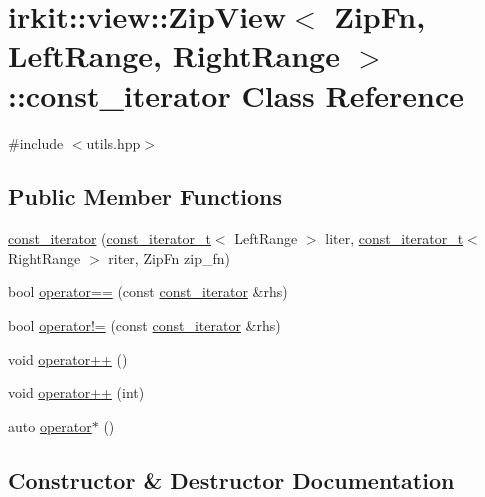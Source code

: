 \hypertarget{classirkit_1_1view_1_1ZipView_1_1const__iterator}{}\section{irkit\+:\+:view\+:\+:Zip\+View$<$ Zip\+Fn, Left\+Range, Right\+Range $>$\+:\+:const\+\_\+iterator Class Reference}
\label{classirkit_1_1view_1_1ZipView_1_1const__iterator}


{\ttfamily \#include $<$utils.\+hpp$>$}

\subsection*{Public Member Functions}
\begin{DoxyCompactItemize}
\item 
\hyperlink{classirkit_1_1view_1_1ZipView_1_1const__iterator_a92caec773c73fe7720f274fdb4d14444}{const\+\_\+iterator} (\hyperlink{namespaceirkit_a4b1668583041117eb42c1b5a1091b804}{const\+\_\+iterator\+\_\+t}$<$ Left\+Range $>$ liter, \hyperlink{namespaceirkit_a4b1668583041117eb42c1b5a1091b804}{const\+\_\+iterator\+\_\+t}$<$ Right\+Range $>$ riter, Zip\+Fn zip\+\_\+fn)
\item 
bool \hyperlink{classirkit_1_1view_1_1ZipView_1_1const__iterator_ae22d91fa97683693b45408ca06c3a5a8}{operator==} (const \hyperlink{classirkit_1_1view_1_1ZipView_1_1const__iterator}{const\+\_\+iterator} \&rhs)
\item 
bool \hyperlink{classirkit_1_1view_1_1ZipView_1_1const__iterator_ad4c15fc5387d6453fc25e7b0232e10ac}{operator!=} (const \hyperlink{classirkit_1_1view_1_1ZipView_1_1const__iterator}{const\+\_\+iterator} \&rhs)
\item 
void \hyperlink{classirkit_1_1view_1_1ZipView_1_1const__iterator_afa50a93c355dff998a3872ead97c29d7}{operator++} ()
\item 
void \hyperlink{classirkit_1_1view_1_1ZipView_1_1const__iterator_a47598d8f9f86eabb28576be721c15d4a}{operator++} (int)
\item 
auto \hyperlink{classirkit_1_1view_1_1ZipView_1_1const__iterator_ae8a7914b8e3d6a1a0bbff1046708acd5}{operator$\ast$} ()
\end{DoxyCompactItemize}


\subsection{Constructor \& Destructor Documentation}
\mbox{\label{classirkit_1_1view_1_1ZipView_1_1const__iterator_a92caec773c73fe7720f274fdb4d14444}} 
